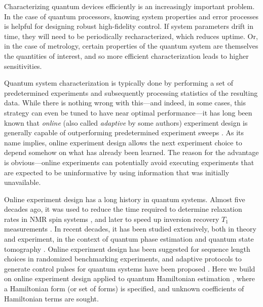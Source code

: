 \documentclass[aps,nofootinbib,twocolumn,superscriptaddress]{revtex4}
\begin{document}
Characterizing quantum devices efficiently is an increasingly
important problem.
In the case of quantum processors, knowing system properties
and error processes is helpful for designing robust high-fidelity control.
If system parameters drift in time, they will
need to be periodically recharacterized, which reduces uptime.
Or, in the case of metrology, certain properties of the quantum
system are themselves the quantities of interest, and so more efficient
characterization leads to higher sensitivities.

Quantum system characterization is typically done by performing
a set of predetermined experiments and subsequently processing
statistics of the resulting data.
While there is nothing wrong with this---and indeed, in some cases,
this strategy can even be tuned to have near optimal performance---it
has long been known that \textit{online}
(also called \textit{adaptive} by some authors)
experiment design is generally
capable of outperforming predetermined experiment sweeps
\cite{chaloner_bayesian_1995,higgins_demonstrating_2009}.
As its name implies, online experiment design allows the next experiment
choice to depend somehow on what has already been learned.
The reason for the advantage is obvious---online
experiments can potentially avoid executing experiments that
are expected to be uninformative by using information that was
initially unavailable.

Online experiment design has a long history in quantum systems. Almost five decades ago, it was used to reduce the time required to
determine relaxation rates in NMR spin systems \cite{freeman_adaptive_1972},
and later to speed up inversion recovery $T_1$ measurements
\cite{taitelbaum_twostage_1993}.
In recent decades, it has been studied extensively, both in theory
and experiment, in the context of quantum phase estimation
\cite{
    wiseman_adaptive_1995,
    berry_optimal_2001,
    higgins_entanglementfree_2007,
    berry_how_2009,
    higgins_demonstrating_2009,
    xiang_entanglementenhanced_2011,
    yonezawa_quantumenhanced_2012,
    ciampini_quantumenhanced_2016}
and quantum state tomography
\cite{
    huszar_adaptive_2012,
    kravtsov_experimental_2013,
    ferrie_selfguided_2014,
    stenberg_adaptive_2015,
    struchalin_experimental_2016,
    granade_practical_2016,
    qi_adaptive_2017}.
Online experiment design has been suggested for sequence length choices in
randomized benchmarking experiments\cite{granade_accelerated_2015},
and adaptive protocols
to generate control pulses for quantum systems have been proposed
\cite{egger_adaptive_2014,ferrie_robust_2015,rol_restless_2017}.
Here we build on online experiment design applied to
quantum Hamiltonian estimation
\cite{
    sergeevich_characterization_2011,
    granade_robust_2012,
    ferrie_how_2013,
    wiebe_hamiltonian_2014,
    stenberg_simultaneous_2016,
    stenberg_characterization_2016},
where a Hamiltonian form (or set of forms) is specified, and
unknown coefficients of Hamiltonian terms are sought.
\end{document}
